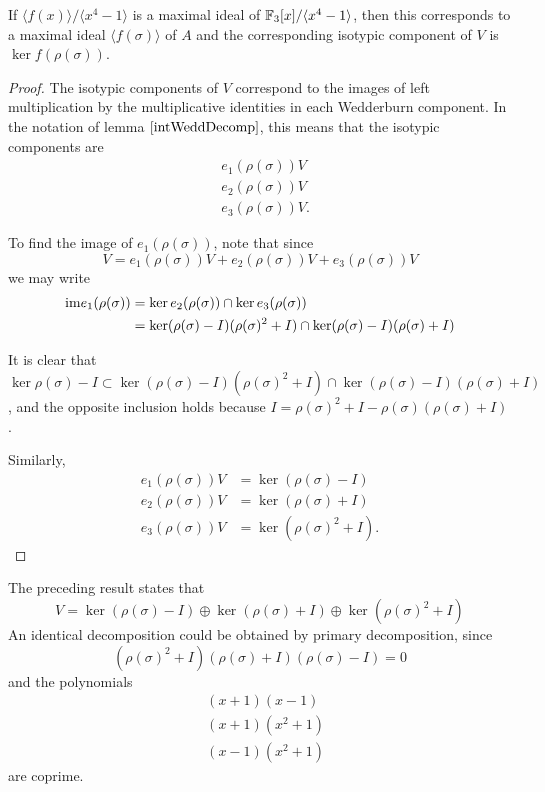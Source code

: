 \documentclass{unswmaths}
\begin{document}
\begin{proposition}
    If $\langle f(x)\rangle/\langle x^4-1\rangle$ is a maximal ideal of ${\mathbb{F}_3}[x]/\langle x^4-1\rangle$, then
    this corresponds to a maximal ideal $\langle f(\sigma)\rangle$ of $A$ and the corresponding
    isotypic component of $V$ is $\ker f(\rho(\sigma))$.
\end{proposition}
\begin{proof}
    The isotypic components of $V$ correspond to the images of left multiplication
    by the multiplicative identities in each Wedderburn component. In the notation
    of lemma $\ref{intWeddDecomp}$, 
    this means that the isotypic components are
    \begin{align*}
        &e_1(\rho(\sigma))V\\
        &e_2(\rho(\sigma))V\\
        &e_3(\rho(\sigma))V.
    \end{align*}
    
    To find the image of $e_1(\rho(\sigma))$, note that since
    \begin{equation*}
        V = e_1(\rho(\sigma))V+e_2(\rho(\sigma))V+e_3(\rho(\sigma))V
    \end{equation*}
    we may write
    \begin{align*}
        {\operatorname{im}} e_1(\rho(\sigma)) &= \ker e_2(\rho(\sigma))\cap\ker e_3(\rho(\sigma))\\
                              &= \ker (\rho(\sigma)-I)(\rho(\sigma)^2+I)\cap \ker (\rho(\sigma)-I)(\rho(\sigma)+I)
    \end{align*}
    
    
    It is clear that $\ker \rho(\sigma)-I \subset \ker (\rho(\sigma)-I)(\rho(\sigma)^2+I)\cap \ker (\rho(\sigma)-I)(\rho(\sigma)+I)$,
    and the opposite inclusion holds because $I = \rho(\sigma)^2+I-\rho(\sigma)(\rho(\sigma)+I)$.
    
    Similarly,
    \begin{align*}
        e_1(\rho(\sigma))V &= \ker (\rho(\sigma)-I)\\
        e_2(\rho(\sigma))V &= \ker (\rho(\sigma)+I)\\
        e_3(\rho(\sigma))V &= \ker (\rho(\sigma)^2+I).
    \end{align*}    
\end{proof}
\begin{remark}
    The preceding result states that
    \begin{equation*}
        V = \ker (\rho(\sigma)-I)\oplus \ker (\rho(\sigma)+I)\oplus \ker (\rho(\sigma)^2+I)
    \end{equation*}
    An identical decomposition could be obtained by primary decomposition, since
    \begin{equation*}
        (\rho(\sigma)^2+I)(\rho(\sigma)+I)(\rho(\sigma)-I) = 0
    \end{equation*}
    and the polynomials
    \begin{align*}
        &(x+1)(x-1)\\
        &(x+1)(x^2+1)\\
        &(x-1)(x^2+1)
    \end{align*}
    are coprime.
\end{remark}
\end{document}
